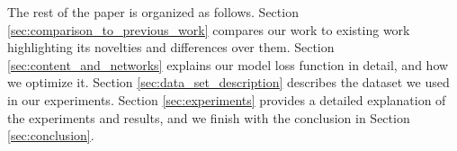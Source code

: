 The rest of the paper is organized as follows.  Section \ref{sec:comparison_to_previous_work} compares
our work to existing work highlighting its novelties and differences over them.  
Section \ref{sec:content_and_networks} explains our model loss function in detail, and how
we optimize it.  Section \ref{sec:data_set_description} describes the dataset we used in our experiments.
Section \ref{sec:experiments} provides a detailed explanation of the experiments and results,
and we finish with the conclusion in Section \ref{sec:conclusion}.
\vspace{-0.2cm}
